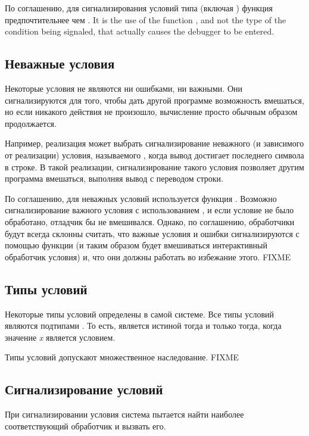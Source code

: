 По соглашению, для сигнализирования условий типа 
(включая ) функция  предпочтительнее чем .  It
is the use of the function , and not the type of the condition being
signaled, that actually causes the debugger to be entered.


\subsection{Неважные условия}

Некоторые условия не являются ни ошибками, ни важными. Они сигнализируются для
того, чтобы дать другой программе возможность вмешаться, но если никакого
действия не произошло, вычисление просто обычным образом продолжается.

Например, реализация может выбрать сигнализирование неважного (и зависимого от
реализации) условия, называемого , когда вывод достигает
последнего символа в строке. В такой реализации, сигнализирование такого условия
позволяет другим программа вмешаться, выполняя вывод с переводом строки.

По соглашению, для неважных условий используется функция . Возможно
сигнализирование важного условия с использованием , и если условие
не было обработано, отладчик бы не вмешивался. Однако, по соглашению,
обработчики будут всегда склонны считать, что важные условия и ошибки
сигнализируются с помощью функции  (и таким образом будет вмешиваться
интерактивный обработчик условия) и, что они должны работать во избежание
этого. FIXME

\subsection{Типы условий}

Некоторые типы условий определены в самой системе. Все типы условий являются
подтипами . То есть,  является
истиной тогда и только тогда, когда значение \emph{x} является условием.

Типы условий допускают множественное наследование. FIXME

\subsection{Сигнализирование условий}

При сигнализировании условия система пытается найти наиболее соответствующий
обработчик и вызвать его.

